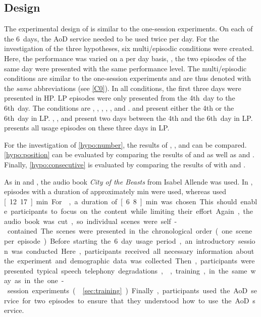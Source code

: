\subsection{Design}
The experimental design of  is similar to the one-session experiments.
On each of the 6~days, the \ac{AoD} service needed to be used twice per day.
For the investigation of the three hypotheses, six multi\-/episodic conditions were created.
Here, the performance was varied on a per day basis, \ie, the two episodes of the same day were presented with the same performance level.
The multi\-/episodic conditions are similar to the one-session experiments and are thus denoted with the \emph{same} abbreviations (see \autoref{C0}).
In all conditions, the first three days were presented in \ac{HP}.
\ac{LP} episodes were only presented from the 4th~day to the 6th~day.
The conditions are , , , , , and .
 and  present either the 4th or the 6th~day in \ac{LP}.
, , and  present two days between the 4th and the 6th~day in \ac{LP}.
 presents all usage episodes on these three days in \ac{LP}.

For the investigation of \autoref{hypo:number}, the results of , , and  can be compared.
\autoref{hypo:position} can be evaluated by comparing the results of  and  as well as  and .
Finally, \autoref{hypo:consecutive} is evaluated by comparing the results of  with  and .

As in  and , the audio book \emph{City of the Beasts} from Isabel Allende was used.
In , episodes with a duration of approximately \unit[3]{min} were used, whereas  used \unit[12..17]{min}.
For , a duration of \unit[6..8]{min} was chosen.
This should enable participants to focus on the content while limiting their effort.
Again, the audio book was cut, so individual scenes were self-contained.
The scenes were presented in the chronological order (one scene per episode).

Before starting the 6~day usage period, an introductory session was conducted.
Here, participants received all necessary information about the experiment and demographic data was collected.
Then, participants were presented typical speech telephony degradations, \ie, training, in the same way as in the one-session experiments (\cf{} \autoref{sec:training}).
Finally, participants used the \ac{AoD} service for two episodes to ensure that they understood how to use the \ac{AoD} service.

